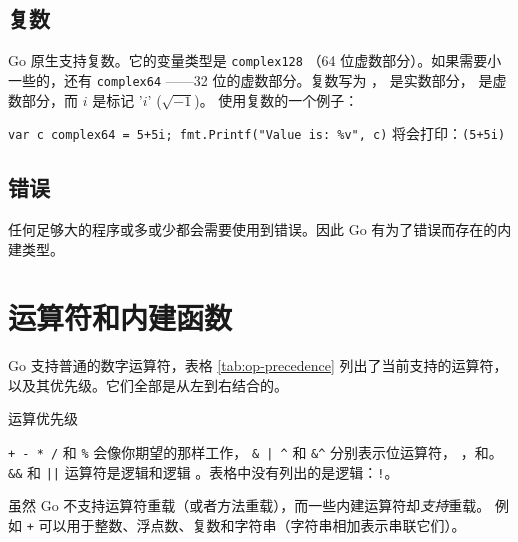 \subsection{复数}
Go 原生支持复数。它的变量类型是 \lstinline{complex128}
（64 位虚数部分）。如果需要小一些的，还有 \lstinline{complex64}
——32 位的虚数部分。复数写为 ， 是实数部分，
 是虚数部分，而 $i$ 是标记 '$i$' ($\sqrt{-1}$)。
使用复数的一个例子：

\lstinline{var c complex64 = 5+5i; fmt.Printf("Value is: %v", c)}\newline
将会打印：\lstinline{(5+5i)}

\subsection{错误}
任何足够大的程序或多或少都会需要使用到错误。因此 Go 有为了错误而存在的内建类型。

\section{运算符和内建函数}
Go 支持普通的数字运算符，表格 \ref{tab:op-precedence} 列出了当前支持的运算符，
以及其优先级。它们全部是从左到右结合的。

\begin{table}[H]
\begin{center}
\caption{运算优先级}
\label{tab:op-precedence}

\end{center}
\end{table}
\verb|+ - * /| 和 \verb|%| 会像你期望的那样工作，
\verb!& | ^!
和 \verb!&^! 分别表示位运算符，
，和。
\verb|&&| 和 \verb/||/ 运算符是逻辑和逻辑
。表格中没有列出的是逻辑：\verb/!/。

虽然 Go 不支持运算符重载（或者方法重载），而一些内建运算符却\emph{支持}重载。
例如 \texttt{+} 可以用于整数、浮点数、复数和字符串（字符串相加表示串联它们）。

